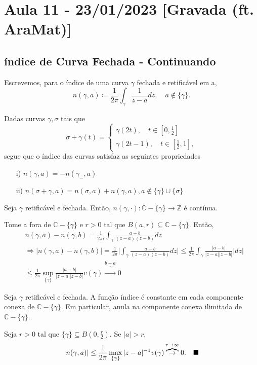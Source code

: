 \documentclass[ComplexAnalysis/complex.tex]{subfiles}
\begin{document}
\section{Aula 11 - 23/01/2023 [Gravada (ft. AraMat)]}
\subsection{índice de Curva Fechada - Continuando}
\begin{def*}
	Escrevemos, para o índice de uma curva $\gamma$ fechada e retificável em a,
	$$
		n(\gamma, a)\coloneqq  \frac{1}{2\pi}\int_{\gamma}^{}\frac{1}{z-a}dz, \quad a\not\in \{\gamma\}.
	$$
\end{def*}
\begin{prop*}
	Dadas curvas $\gamma, \sigma$ tais que
	$$
		\sigma + \gamma(t)  = \left\{\begin{array}{ll}
			\gamma(2t), \quad t\in[0, \frac{1}{2}] \\
			\gamma(2t-1), \quad t\in[\frac{1}{2}, 1],
		\end{array}\right.
	$$
	segue que o índice das curvas satisfaz as seguintes propriedades
	\begin{itemize}
		\item[i)] $n(\gamma, a) = -n(\gamma_{-}, a)$
		\item[ii)] $n(\sigma+\gamma, a) = n(\sigma, a) + n(\gamma, a), a\not\in \{\gamma\}\cup \{\sigma\}$
	\end{itemize}
\end{prop*}
\begin{prop*}
	Seja $\gamma$ retificável e fechada. Então, $n(\gamma, \cdot):\mathbb{C}-\{\gamma\} \rightarrow \mathbb{Z}$ é contínua.
\end{prop*}
\begin{proof*}
	Tome a fora de $\mathbb{C}-\{\gamma\}$ e $r > 0\text{ tal que } B(a, r)\subseteq{\mathbb{C}-\{\gamma\}}$. Então,
	\begin{align*}
		 & n(\gamma, a) - n(\gamma, b) = \frac{1}{2\pi i}\int_{\gamma}^{}\frac{a - b}{(z-a)(z-b)}dz                                                                                       \\
		 & \Rightarrow|n(\gamma, a) - n(\gamma, b)| = \frac{1}{2\pi}\biggl|\int_{\gamma}^{}\frac{a-b}{(z-a)(z-b)}dz\biggr|\leq \frac{1}{2\pi}\int_{\gamma}^{}\frac{|a-b|}{|z-a||z-b|}|dz| \\
		 & \leq\frac{1}{2\pi}\sup_{\{\gamma\} }\frac{|a-b|}{|z-a||z-b|}v(\gamma)\overbrace{\to}^{b-a}0
	\end{align*}
\end{proof*}
\begin{theorem*}
	Seja $\gamma$ retificável e fechada. A função índice é constante em cada componente conexa de $\mathbb{C}-\{\gamma\}.$
	Em particular, anula na componente conexa ilimitada de $\mathbb{C}-\{\gamma\} $.
\end{theorem*}
\begin{proof*}
	Seja $r > 0$ tal que $\{\gamma\}\subseteq{B(0, \frac{r}{2})}.$ Se $|a| > r,$
	$$
		|n(\gamma, a)|\leq \frac{1}{2\pi}\max_{\{\gamma\}}|z-a|^{-1}v(\gamma)\overbrace{\to}^{r\to\infty}0. \quad\text{$\blacksquare$}
	$$
\end{proof*}
\end{document}
